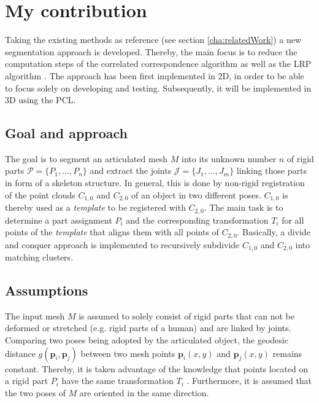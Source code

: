 \chapter{My contribution}
\label{cha:TheThesis}

Taking the existing methods as reference (see section \ref{cha:relatedWork}) a new segmentation approach is developed. Thereby, the main focus is to reduce the computation steps of the correlated correspondence algorithm \cite{CorrelatedCorrespondance} as well as the LRP algorithm \cite {guo2016correspondence}. The approach has been first implemented in 2D, in order to be able to focus solely on developing and testing. Subsequently, it will be implemented in 3D using the PCL.

\section{Goal and approach}

The goal is to segment an articulated mesh $M$ into its unknown number $n$ of rigid parts $\mathcal{P} =  \{P_1,\ldots,P_n\}$ and extract the joints $\mathcal{J} =  \{J_1,\ldots,J_m\}$ linking those parts in form of a skeleton structure. In general, this is done by non-rigid registration of the point clouds $C_{1,0}$ and $C_{2,0}$ of an object in two different poses. $C_{1,0}$ is thereby used as a \textit{template} to be registered with $C_{2,0}$. The main task is to determine a part assignment $P_i$ and the corresponding transformation $T_i$ for all points of the \textit{template} that aligns them with all points of $C_{2,0}$. Basically, a divide and conquer approach is implemented to recursively subdivide $C_{1,0}$ and $C_{2,0}$ into matching clusters. 

\section{Assumptions}

The input mesh $M$ is assumed to solely consist of rigid parts that can not be deformed or stretched (e.g. rigid parts of a human) and are linked by joints. Comparing two poses being adopted by the articulated object, the geodesic distance $g(\boldsymbol{p}_i,\boldsymbol{p}_j)$ between two mesh points $\boldsymbol{p}_i(x,y)$ and $\boldsymbol{p}_j(x,y)$ remains constant. Thereby, it is taken advantage of the knowledge that points located on a rigid part $P_i$ have the same transformation $T_i$ . Furthermore, it is assumed that the two poses of $M$ are oriented in the same direction.


